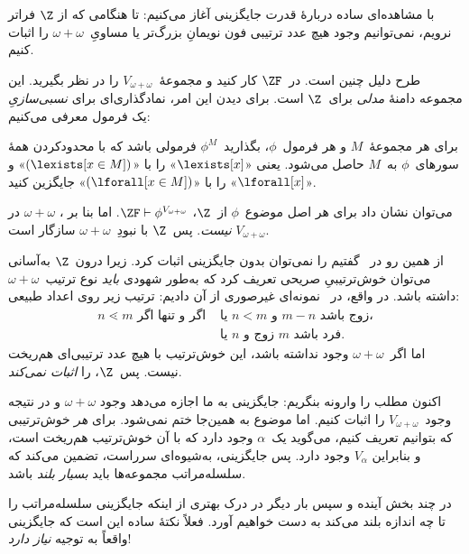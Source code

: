 \documentclass[../../../include/open-logic-section]{subfiles}
\begin{document}

با مشاهده‌ای ساده دربارهٔ قدرت جایگزینی آغاز می‌کنیم: تا هنگامی که از
$\Z$ فراتر نرویم، نمی‌توانیم وجود هیچ عدد ترتیبی فون نویمانِ بزرگ‌تر یا
مساویِ~$\omega+\omega$ را اثبات کنیم.

طرح دلیل چنین است. در~$\ZF$ کار کنید و مجموعهٔ~$V_{\omega+\omega}$ را
در نظر بگیرید. این مجموعه دامنهٔ \emph{مدلی} برای~$\Z$ است. برای دیدن
این امر، نمادگذاری‌ای برای \emph{نسبی‌سازیِ} یک فرمول معرفی می‌کنیم:
\begin{defn}
	برای هر مجموعهٔ~$M$ و هر فرمول~$\phi$، بگذارید~$\phi^M$ فرمولی باشد
	که با محدودکردن همهٔ سورهای~$\phi$ به~$M$ حاصل می‌شود. یعنی
	«$\lexists[x]$» را با «$(\lexists[x \in M])$» و
	«$\lforall[x]$» را با «$(\lforall[x \in M])$» جایگزین کنید.
\end{defn}\noindent
می‌توان نشان داد برای هر اصل موضوع~$\phi$ از~$\Z$،
$\ZF\vdash\phi^{V_{\omega+\omega}}$. اما بنا بر
، $\omega+\omega$ در
$V_{\omega+\omega}$ \emph{نیست}. پس~$\Z$ با نبودِ~$\omega+\omega$
سازگار است.

از همین رو در~ گفتیم
 را نمی‌توان بدون
جایگزینی اثبات کرد. زیرا درون~$\Z$ به‌آسانی می‌توان خوش‌ترتیبیِ صریحی
تعریف کرد که به‌طور شهودی \emph{باید} نوع ترتیب~$\omega+\omega$ داشته
باشد. در واقع، در~ نمونه‌ای غیرصوری از آن
دادیم: ترتیب زیر روی اعداد طبیعی:
\begin{align*}
	n \lessdot m \text{ اگر و تنها اگر }&\text{یا }n < m\text{ و }m-n\text{ زوج باشد،}\\
	& \text{یا $n$ زوج و $m$ فرد باشد.}
\end{align*}
اما اگر~$\omega+\omega$ وجود نداشته باشد، این خوش‌ترتیب با هیچ عدد
ترتیبی‌ای هم‌ریخت نیست. پس~$\Z$،
 را \emph{اثبات
نمی‌کند}.

اکنون مطلب را وارونه بنگریم: جایگزینی به ما اجازه می‌دهد وجود
$\omega+\omega$ و در نتیجه وجود~$V_{\omega+\omega}$ را اثبات کنیم.
اما موضوع به همین‌جا ختم نمی‌شود. برای \emph{هر} خوش‌ترتیبی که بتوانیم
تعریف کنیم،  می‌گوید
یک~$\alpha$ وجود دارد که با آن خوش‌ترتیب هم‌ریخت است، و بنابراین
$V_\alpha$ وجود دارد. پس جایگزینی، به‌شیوه‌ای سرراست، تضمین می‌کند که
سلسله‌مراتب مجموعه‌ها باید \emph{بسیار بلند} باشد.

در چند بخش آینده و سپس بار دیگر در
 درک بهتری از اینکه جایگزینی
سلسله‌مراتب را تا چه اندازه بلند می‌کند به دست خواهیم آورد. فعلاً نکتهٔ
ساده این است که جایگزینی واقعاً به توجیه \emph{نیاز دارد}!
\end{document}
